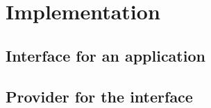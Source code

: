 \chapter{Implementation}

\section{Interface for an application}

\section{Provider for the interface}
